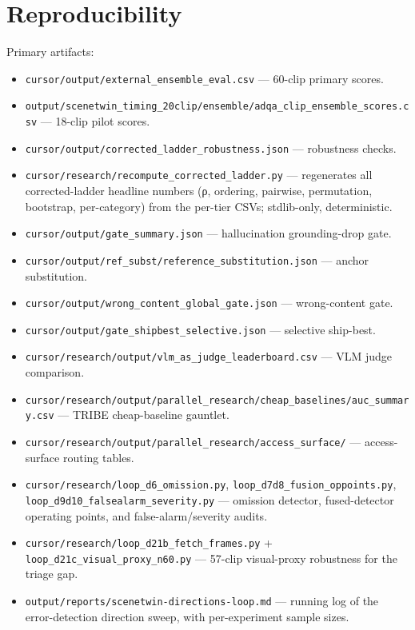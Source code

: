 \documentclass[10pt,twocolumn]{article}
\begin{document}
\section{Reproducibility}


Primary artifacts:


\begin{itemize}[leftmargin=*]
\item \texttt{cursor/output/external\_ensemble\_eval.csv} --- 60-clip primary scores.
\item \texttt{output/scenetwin\_timing\_20clip/ensemble/adqa\_clip\_ensemble\_scores.csv} --- 18-clip pilot scores.
\item \texttt{cursor/output/corrected\_ladder\_robustness.json} --- robustness checks.
\item \texttt{cursor/research/recompute\_corrected\_ladder.py} --- regenerates all corrected-ladder headline numbers (ρ, ordering, pairwise, permutation, bootstrap, per-category) from the per-tier CSVs; stdlib-only, deterministic.
\item \texttt{cursor/output/gate\_summary.json} --- hallucination grounding-drop gate.
\item \texttt{cursor/output/ref\_subst/reference\_substitution.json} --- anchor substitution.
\item \texttt{cursor/output/wrong\_content\_global\_gate.json} --- wrong-content gate.
\item \texttt{cursor/output/gate\_shipbest\_selective.json} --- selective ship-best.
\item \texttt{cursor/research/output/vlm\_as\_judge\_leaderboard.csv} --- VLM judge comparison.
\item \texttt{cursor/research/output/parallel\_research/cheap\_baselines/auc\_summary.csv} --- TRIBE cheap-baseline gauntlet.
\item \texttt{cursor/research/output/parallel\_research/access\_surface/} --- access-surface routing tables.
\item \texttt{cursor/research/loop\_d6\_omission.py}, \texttt{loop\_d7d8\_fusion\_oppoints.py}, \texttt{loop\_d9d10\_falsealarm\_severity.py} --- omission detector, fused-detector operating points, and false-alarm/severity audits.
\item \texttt{cursor/research/loop\_d21b\_fetch\_frames.py} + \texttt{loop\_d21c\_visual\_proxy\_n60.py} --- 57-clip visual-proxy robustness for the triage gap.
\item \texttt{output/reports/scenetwin-directions-loop.md} --- running log of the error-detection direction sweep, with per-experiment sample sizes.
\end{itemize}
\end{document}
